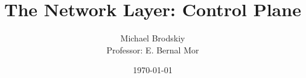 


\title{The Network Layer: Control Plane}
\date{\today}
\author{Michael Brodskiy\\ \small Professor: E. Bernal Mor}



\maketitle

